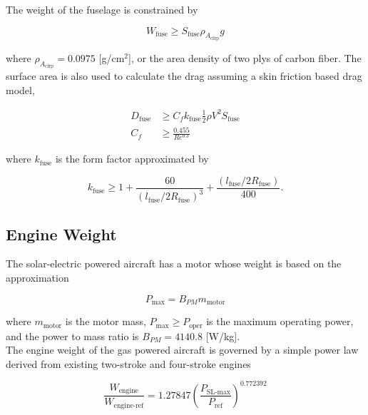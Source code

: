 The weight of the fuselage is constrained by

\begin{equation}
    \label{e:fuseweight}
    W_{\text{fuse}} \geq S_{\text{fuse}} \rho_{A_{\text{cfrp}}} g
\end{equation} 

where $\rho_{A_{\text{cfrp}}} = 0.0975$ [g/cm$^2$], or the area density of two plys of carbon fiber.\cite{carbonfiber}  The surface area is also used to calculate the drag assuming a skin friction based drag model,

\begin{align}
    \label{e:fusedrag}
    D_{\text{fuse}} &\geq C_f k_{\text{fuse}} \frac{1}{2} \rho V^2 S_{\text{fuse}} \\
    C_f &\geq \frac{0.455}{Re^{0.3}}
\end{align}

where $k_{\text{fuse}}$ is the form factor approximated by\cite{raymer}

\begin{equation}
    \label{e:fuseform}
    k_{\text{fuse}} \geq 1 + \frac{60}{(l_{\text{fuse}}/2R_{\text{fuse}})^3} + \frac{(l_{\text{fuse}}/2R_{\text{fuse}})}{400}.
\end{equation}

\subsection{Engine Weight}

The solar-electric powered aircraft has a motor whose weight is based on the approximation\cite{electricengine}

\begin{equation}
    \label{e:electricengine}
    P_{\text{max}} = B_{PM} m_{\text{motor}}
\end{equation}

where $m_{\text{motor}}$ is the motor mass, $P_{\text{max}} \geq P_{\text{oper}}$ is the maximum operating power, and the power to mass ratio is $B_{PM} = 4140.8$ [W/kg]. \\

The engine weight of the gas powered aircraft is governed by a simple power law derived from existing two-stroke and four-stroke engines\cite{gasengine}

\begin{equation}
    \label{e:powerlaw}
    \frac{W_{\text{engine}}}{W_{\text{engine-ref}}} = 1.27847 \left(\frac{P_{\text{SL-max}}}{P_{\text{ref}}} \right)^{0.772392}
\end{equation}

